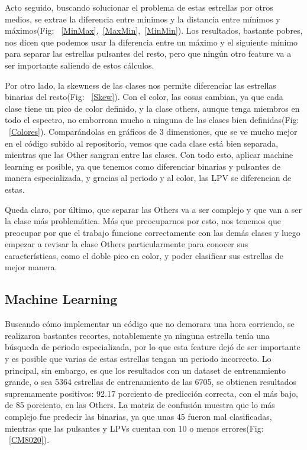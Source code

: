 \documentclass[10pt,twocolumn]{article}
\begin{document}
Acto seguido, buscando solucionar el problema de estas estrellas por otros medios, se extrae la diferencia entre mínimos
y la distancia entre mínimos y máximos(Fig: ~\ref{MinMax},~\ref{MaxMin},~\ref{MinMin}). Los resultados, bastante pobres, nos dicen que podemos usar la diferencia entre 
un máximo y el siguiente mínimo para separar las estrellas pulsantes del resto, pero que ningún otro feature va a ser 
importante saliendo de estos cálculos.

Por otro lado, la skewness de las clases nos permite diferenciar las estrellas binarias del resto(Fig: ~\ref{Skew}).
Con el color, las cosas cambian, ya que cada clase tiene un pico de color definido, y la clase others, aunque tenga miembros en todo el
espectro, no emborrona mucho a ninguna de las clases bien definidas(Fig: ~\ref{Colores}). Comparándolas en gráficos de 3 dimensiones, 
que se ve mucho mejor en el código subido al repositorio, vemos que cada clase está bien separada, mientras que las Other sangran entre 
las clases. Con todo esto, aplicar machine learning es posible, ya que tenemos como diferenciar binarias y pulsantes de manera
especializada, y gracias al periodo y al color, las LPV se diferencian de estas. 

Queda claro, por último, que separar las Others va a ser complejo y que van a ser la clase más problemática. Más que preocuparnos por esto, 
nos tenemos que preocupar por que el trabajo funcione correctamente con las demás clases y luego empezar a revisar la clase Others
particularmente para conocer sus características, como el doble pico en color, y poder clasificar sus estrellas de mejor manera. 

\subsection{Machine Learning}

Buscando cómo implementar un código que no demorara una hora corriendo, se realizaron bastantes recortes, notablemente 
ya ninguna estrella tenía una búsqueda de periodo especializada, por lo que esta feature dejó de ser importante y es posible 
que varias de estas estrellas tengan un periodo incorrecto. Lo principal, sin embargo, es que los resultados con un dataset de 
entrenamiento grande, o sea 5364 estrellas de entrenamiento de las 6705, se obtienen resultados supremamente positivos: 
92.17 porciento de predicción correcta, con el más bajo, de 85 porciento, en las Others. La matriz de confusión muestra que 
lo más complejo fue predecir las binarias, ya que unas 45 fueron mal clasificadas, mientras que las pulsantes y LPVs cuentan 
con 10 o menos errores(Fig: ~\ref{CM8020}). 
\end{document}
